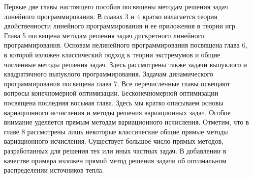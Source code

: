 Первые две главы настоящего пособия посвящены методам решения задач линейного программирования. В главах 3 и 4 кратко излагается теория двойственности линейного программирования и ее приложения в теории игр. Глава 5 посвящена методам решения задач дискретного линейного программирования. Основам нелинейного программирования посвящена глава 6, в которой изложен классический подход к теории экстремумов и общие численные методы решения задач. Здесь рассмотрены также задачи выпуклого и квадратичного выпуклого программирования. Задачам динамического программирования посвящена глава 7. Все перечисленные главы освещают вопросы конечномерной оптимизации. Бесконечномерной оптимизации посвящена последняя восьмая глава. Здесь мы кратко описываем основы вариационного исчисления и методы решения вариационных задач. Особое внимание уделяется прямым методам вариационного исчисления. Отметим, что в главе 8 рассмотрены лишь некоторые классические общие прямые методы вариационного исчисления. Существует большое число прямых методов, разработанных для решения тех или иных частных задач. В добавлении в качестве примера изложен прямой метод решения задачи об оптимальном распределении источников тепла.
